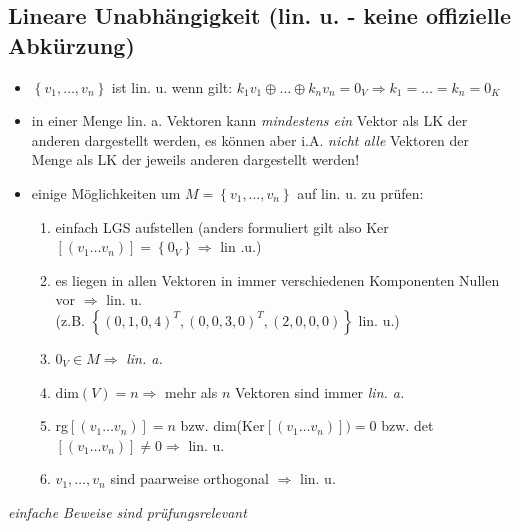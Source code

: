 \documentclass[10pt,a4paper]{article}
\begin{document}
\subsection{Lineare Unabhängigkeit (lin. u. - keine offizielle Abkürzung)}
\begin{itemize}
\item $\left\lbrace v_{1}, \dotsc, v_{n} \right\rbrace$ ist lin. u. wenn gilt: $k_{1}v_{1} \oplus \dotsc \oplus k_{n}v_{n}=0_{V} \Rightarrow k_{1}=\dotsc=k_{n}=0_{K}$ 
\item in einer Menge lin. a. Vektoren kann \textit{mindestens ein} Vektor als LK der anderen dargestellt werden, es können aber i.A. \textit{nicht alle} Vektoren der Menge als LK der jeweils anderen dargestellt werden!
\item einige Möglichkeiten um $M=\left\lbrace v_{1}, \dotsc, v_{n}\right\rbrace$ auf lin. u. zu prüfen:
\begin{enumerate}
\item einfach LGS aufstellen (anders formuliert gilt also Ker$[(v_{1} \dotsc v_{n})]=\left\lbrace 0_{V} \right\rbrace \Rightarrow$ lin .u.)
\item es liegen in allen Vektoren in immer verschiedenen Komponenten Nullen vor $\Rightarrow$ lin. u.\\ (z.B. $\left\lbrace(0,1,0,4)^{T},(0,0,3,0)^{T},(2,0,0,0)\right\rbrace$ lin. u.) 
\item $0_{V} \in M \Rightarrow$ \textit{lin. a.}
\item  dim$(V)=n \Rightarrow$ mehr als $n$ Vektoren sind immer \textit{lin. a.}
\item rg$[(v_{1} \dotsc v_{n})]=n$ bzw. dim(Ker$[(v_{1} \dotsc v_{n})])=0$ bzw. det$[(v_{1} \dotsc v_{n})]\neq 0 \Rightarrow$ lin. u. 
\item $v_{1},\dotsc, v_{n}$ sind paarweise orthogonal $\Rightarrow$ lin. u.
\end{enumerate}

\end{itemize}
\textit{einfache Beweise sind prüfungsrelevant}
\end{document}
